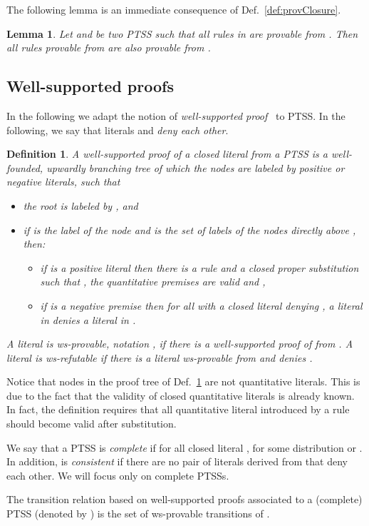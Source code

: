 \documentclass[submission,copyright,creativecommons]{eptcs}
\newtheorem{definition}{Definition}
\newtheorem{lemma}{Lemma}
\newcommand{\colorpar}[3]{\colorbox{#1}{\parbox{#2}{#3}}}
\newcommand{\marginremark}[3]{\marginpar{\colorpar{#2}{\linewidth}{\color{#1}#3}}}
\newcommand{\remarkPRD}[1]{\marginremark{darkred}{lightred}{\tiny{[PRD]~ #1}}}
\newcommand{\remarkDG}[1]{\marginremark{darkgreen}{lightyellow}{\tiny{[DG]~ #1}}}
\renewcommand{\remarkDG}[1]{}
\renewcommand{\remarkPRD}[1]{}
\begin{document}
The following lemma is an immediate consequence of Def.~\ref{def:provClosure}.
\begin{lemma}\label{lemma:provability}
 Let  and  be two PTSS such that all rules in  are provable from . Then all rules provable from  are also provable from .
\end{lemma}


\subsection{Well-supported proofs}


In the following we adapt the notion of \emph{well-supported proof}~\cite{vanGlabbeek04} to PTSS.
In the following, we say that literals  and  \emph{deny each other}.

\begin{definition}
 \label{def:ws-proof}
 A \emph{well-supported proof} of a closed literal  from a PTSS
  is a well-founded, upwardly branching tree of which the nodes
 are labeled by positive or negative literals, such that
\begin{itemize}
 \item the root is labeled by , and 
 \item if  is the label of the node  and  is the set of labels of 
  the nodes directly above , then:
\begin{itemize}
 \item if  is a positive literal then there is a rule  and a closed proper substitution  such that 
          , the quantitative premises  are valid and  
          ,
\item if  is a negative premise then for all  with  a closed literal denying , a 
       literal in  denies a literal in .
\end{itemize}
\end{itemize}
A literal  is \emph{ws-provable}, notation , if there is a well-supported proof of
 from . A literal  is \emph{ws-refutable} if there is a literal  ws-provable from  and  denies .
\end{definition}

Notice that nodes in the proof tree of Def.~\ref{def:ws-proof} are not
quantitative literals.  This is due to the fact that the validity of
closed quantitative literals is already known.  In fact, the
definition requires that all quantitative literal introduced by a rule
 should become valid after substitution.



We say that a PTSS  is \emph{complete} if for all closed literal ,  for some distribution  or .
In addition,  is \emph{consistent} if there are no pair of literals
derived from  that deny each other.
We will focus only on complete PTSSs. 
\remarkDG{Main theorem does not require completeness, so for which part and why is completeness required?}
\remarkPRD{You are right and I thought of it, but since we are defining in this paper the concept of a model based on well-supported proof maybe it is ok to keep it.  Anyway I am not really aiming to push this.  If space is needed, this would be a candidate to remove}
The transition relation based on well-supported proofs associated to 
a (complete) PTSS  (denoted by ) is the set of ws-provable transitions
of .
\end{document}
